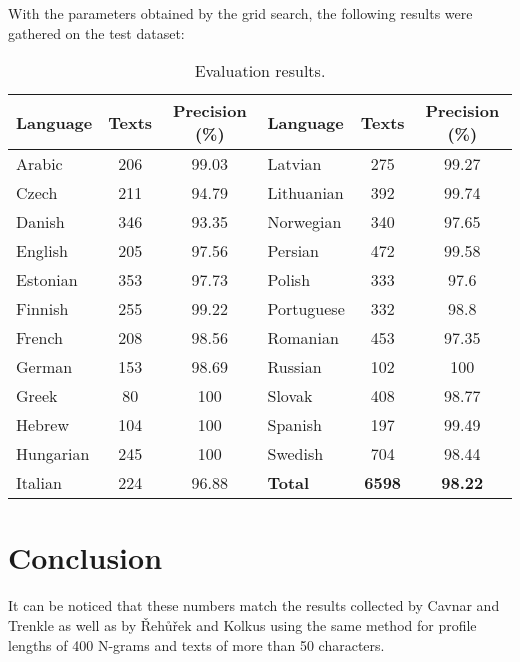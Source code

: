 \documentclass{llncs}
\begin{document}
With the parameters obtained by the grid search, the following results were gathered on the test dataset:

\begin{table}[H]
\caption{Evaluation results.}
\begin{center}
\begin{tabular}{l c c l c c }
\hline
\rule{0pt}{12pt}
\textbf{Language} & \textbf{Texts} & \textbf{Precision} (\%) & \textbf{Language} & \textbf{Texts} & \textbf{Precision} (\%)\\[2pt]
\hline\rule{0pt}{12pt}\mbox{}\par\nobreak
Arabic    & 206   & 99.03     & Latvian    & 275   & 99.27     \\
Czech     & 211   & 94.79     & Lithuanian & 392   & 99.74     \\
Danish    & 346   & 93.35     & Norwegian  & 340   & 97.65     \\
English   & 205   & 97.56     & Persian    & 472   & 99.58     \\
Estonian  & 353   & 97.73     & Polish     & 333   & 97.6      \\
Finnish   & 255   & 99.22     & Portuguese & 332   & 98.8      \\
French    & 208   & 98.56     & Romanian   & 453   & 97.35     \\
German    & 153   & 98.69     & Russian    & 102   & 100       \\
Greek     & 80    & 100       & Slovak     & 408   & 98.77     \\
Hebrew    & 104   & 100       & Spanish    & 197   & 99.49     \\
Hungarian & 245   & 100       & Swedish    & 704   & 98.44     \\
Italian   & 224   & 96.88     & \textbf{Total}      & \textbf{6598}  & \textbf{98.22}     \\ [2pt]
\hline
\end{tabular}
\end{center}
\end{table}

\section{Conclusion}
It can be noticed that these numbers match the results collected by Cavnar and Trenkle \cite{n-gram-basedtext} as well as by Řehůřek and Kolkus \cite{rehurek-kolkus} using the same method for profile lengths of 400 N-grams and texts of more than 50 characters.




\end{document}
